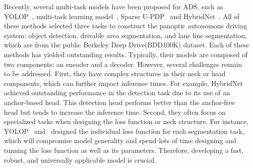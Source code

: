 \documentclass[lettersize,journal]{IEEEtran}
\begin{document}
Recently, several multi-task models have been proposed for ADS, such as YOLOP~\cite{wu2022yolop}, multi-task learning model~\cite{miraliev2023real}, Sparse U-PDP~\cite{wang2023sparse} and HybridNet~\cite{vu2022hybridnets}. All of these methods selected three tasks to construct the panoptic autonomous driving system: object detection, drivable area segmentation, and lane line segmentation, which are from the public Berkeley Deep Drive(BDD100K) dataset. Each of these methods has yielded outstanding results. Typically, their models are composed of two components: an encoder and a decoder. However, several challenges remain to be addressed. First, they have complex structures in their neck or head components, which can further impact inference times. For example, HybridNet~\cite{vu2022hybridnets} achieved outstanding performance in the detection task due to its use of an anchor-based head. This detection head performs better than the anchor-free head but tends to increase the inference time. Second, they often focus on specialized tasks when designing the loss function or neck structure. For instance, YOLOP~\cite{wu2022yolop} and~\cite{miraliev2023real} designed the individual loss function for each segmentation task, which will compromise model generality and spend lots of time designing and tunning the loss function as well as its parameters. Therefore, developing a fast, robust, and universally applicable model is crucial.
\end{document}
